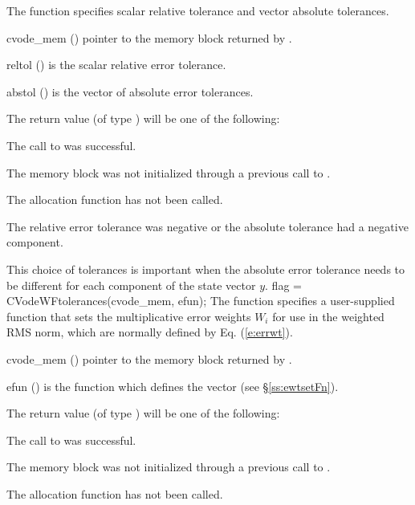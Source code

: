 {
  The function  specifies scalar relative tolerance and
  vector absolute tolerances.
}
{
  \begin{args}
  \item[cvode\_mem] ()
    pointer to the {\cvode} memory block returned by .
  \item[reltol] ()
    is the scalar relative error tolerance.
  \item[abstol] ()
    is the vector of absolute error tolerances.
  \end{args}
}
{
  The return value  (of type ) will be one of the following:
  \begin{args}
  \item[\Id{CV\_SUCCESS}]
    The call to  was successful.
  \item[\Id{CV\_MEM\_NULL}]
    The {\cvode} memory block was not initialized through a previous call to
    .
  \item[\Id{CV\_NO\_MALLOC}]
    The allocation function  has not been called.
  \item[\Id{CV\_ILL\_INPUT}]
    The relative error tolerance was negative or the absolute tolerance
    had a negative component.
  \end{args}
}
{
  This choice of tolerances is important when the absolute error tolerance needs to
  be different for each component of the state vector $y$.
}
{
  flag = CVodeWFtolerances(cvode\_mem, efun);
}
{
  The function  specifies a user-supplied function 
  that sets the multiplicative error weights $W_i$ for use in the weighted
  RMS norm, which are normally defined by Eq. (\ref{e:errwt}).
}
{
  \begin{args}
  \item[cvode\_mem] ()
    pointer to the {\cvode} memory block returned by .
  \item[efun] ()
    is the {\CC} function which defines the  vector (see
    \S\ref{ss:ewtsetFn}).
  \end{args}
}
{
  The return value  (of type ) will be one of the following:
  \begin{args}
  \item[\Id{CV\_SUCCESS}]
    The call to  was successful.
  \item[\Id{CV\_MEM\_NULL}]
    The {\cvode} memory block was not initialized through a previous call to
    .
  \item[\Id{CV\_NO\_MALLOC}]
    The allocation function  has not been called.
  \end{args}
}
{}

